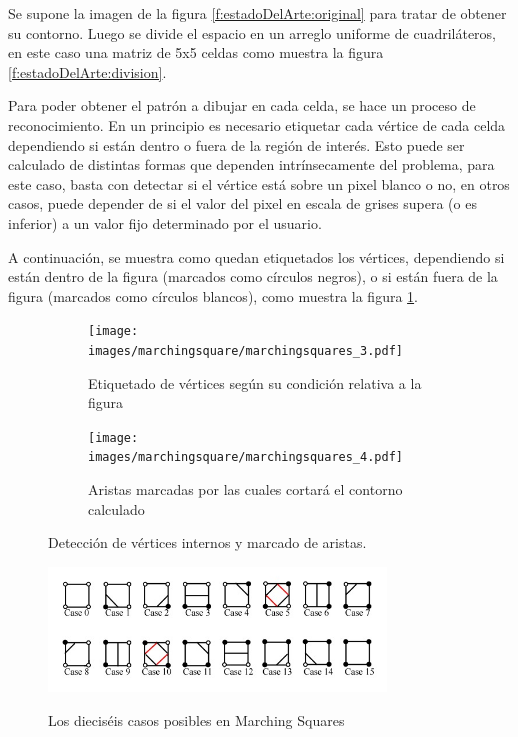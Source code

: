 Se supone la imagen de la figura \ref{f:estadoDelArte:original} para tratar de obtener su contorno. Luego se divide el espacio en un arreglo uniforme de cuadriláteros, en este caso una
matriz de 5x5 celdas como muestra la figura \ref{f:estadoDelArte:division}.

Para poder obtener el patrón a dibujar en cada celda, se hace un proceso de
reconocimiento. En un principio es necesario etiquetar cada vértice de cada celda dependiendo si
están dentro o fuera de la región de interés. Esto puede ser calculado de distintas formas que
dependen intrínsecamente del problema, para este caso, basta con detectar si el vértice está sobre
un pixel blanco o no, en otros casos, puede depender de si el valor del pixel en escala de
grises supera (o es inferior) a un valor fijo determinado por el usuario.

A continuación, se muestra como quedan etiquetados los vértices, dependiendo si están
dentro de la figura (marcados como círculos negros), o si están fuera de la figura (marcados como círculos blancos), como muestra la figura \ref{f:estadoDelArte:labeledobj}.

\newpage
\begin{figure}[h]

	\begin{subfigure}[h]{0.46\textwidth}
		\centering
			\texttt{[image: images/marchingsquare/marchingsquares\_3.pdf]}
		\caption{Etiquetado de vértices según su condición relativa a la figura}
		\label{f:estadoDelArte:labeledobj}
	\end{subfigure}
	\quad
	\begin{subfigure}[h]{0.46\textwidth}
		\centering
			\texttt{[image: images/marchingsquare/marchingsquares\_4.pdf]}
		\caption{Aristas marcadas por las cuales cortará el contorno calculado}
		\label{f:estadoDelArte:purpledobj}
	\end{subfigure}

	\caption{Detección de vértices internos y marcado de aristas.}

\end{figure}

\begin{figure}[h]
\centering
	\fbox
	{
		\includegraphics[width=0.8\textwidth]{images/marchingsquare/cases.jpg}
	}
\caption{Los dieciséis casos posibles en Marching Squares}
\label{f:estadoDelArte:cases}
\end{figure}


